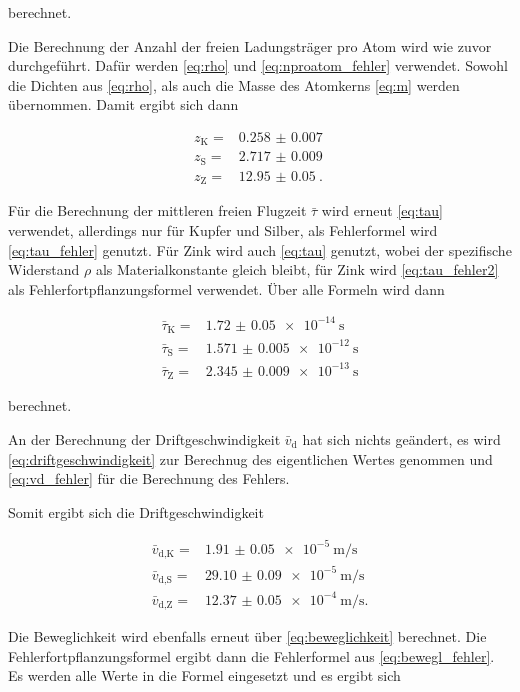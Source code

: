 berechnet.

Die Berechnung der Anzahl der freien Ladungsträger pro Atom wird wie zuvor durchgeführt.
Dafür werden \autoref{eq:rho} und \autoref{eq:nproatom_fehler} verwendet.
Sowohl die Dichten aus \autoref{eq:rho}, als auch die Masse des Atomkerns \autoref{eq:m} werden übernommen.
Damit ergibt sich dann 

\begin{align*}
    z_\text{K} =& \SI{0.258(7)}{} \\
    z_\text{S} =& \SI{2.717(9)}{} \\
    z_\text{Z} =& \SI{12.95(5)}{}.
\end{align*}

Für die Berechnung der mittleren freien Flugzeit $\bar{\tau}$ wird erneut \autoref{eq:tau} verwendet, allerdings nur für Kupfer und Silber, als Fehlerformel wird \autoref{eq:tau_fehler} genutzt.
Für Zink wird auch \autoref{eq:tau} genutzt, wobei der spezifische Widerstand $\rho$ als Materialkonstante gleich bleibt, für Zink wird \autoref{eq:tau_fehler2} als Fehlerfortpflanzungsformel verwendet.
Über alle Formeln wird dann 

\begin{align*}
    \bar{\tau}_\text{K} =& \SI{1.72(5)e-14}{\second} \\
    \bar{\tau}_\text{S} =& \SI{1.571(5)e-12}{\second} \\
    \bar{\tau}_\text{Z} =& \SI{2.345(9)e-13}{\second}
\end{align*}

berechnet.

An der Berechnung der Driftgeschwindigkeit $\bar{v}_\text{d}$ hat sich nichts geändert, es wird \autoref{eq:driftgeschwindigkeit} zur Berechnug des eigentlichen Wertes genommen und \autoref{eq:vd_fehler} für die Berechnung des Fehlers.

Somit ergibt sich die Driftgeschwindigkeit

\begin{align*}
    \bar{v}_\text{d,K} =& \SI{1.91(5)e-5}{\meter\per\second} \\
    \bar{v}_\text{d,S} =& \SI{29.10(9)e-5}{\meter\per\second} \\
    \bar{v}_\text{d,Z} =& \SI{12.37(5)e-4}{\meter\per\second}.
\end{align*}

Die Beweglichkeit wird ebenfalls erneut über \autoref{eq:beweglichkeit} berechnet.
Die Fehlerfortpflanzungsformel ergibt dann die Fehlerformel aus \autoref{eq:bewegl_fehler}.
Es werden alle Werte in die Formel eingesetzt und es ergibt sich 


